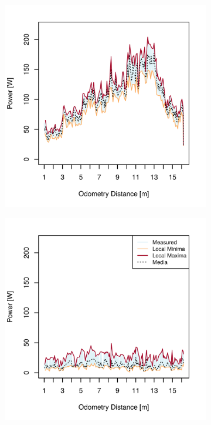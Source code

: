 \begin{figure}[h]
\begin{subfigure}[t]{\subfigureWidth}
        \includegraphics[height=\graphicsHeight]{sections/locomotion-power-draws/plots/drive-power-draw-on-upslope-terrain.png}
		\label{fig:plot:sub:sherpatt-disaggregated-upslope-terrain-power-draw-drive}
	\end{subfigure}\hfill
    \begin{subfigure}[t]{\subfigureWidth}
        \centering
        \includegraphics[height=\graphicsHeight]{sections/locomotion-power-draws/plots/suspension-power-draw-on-upslope-terrain.png}

\end{subfigure}
\end{figure}
